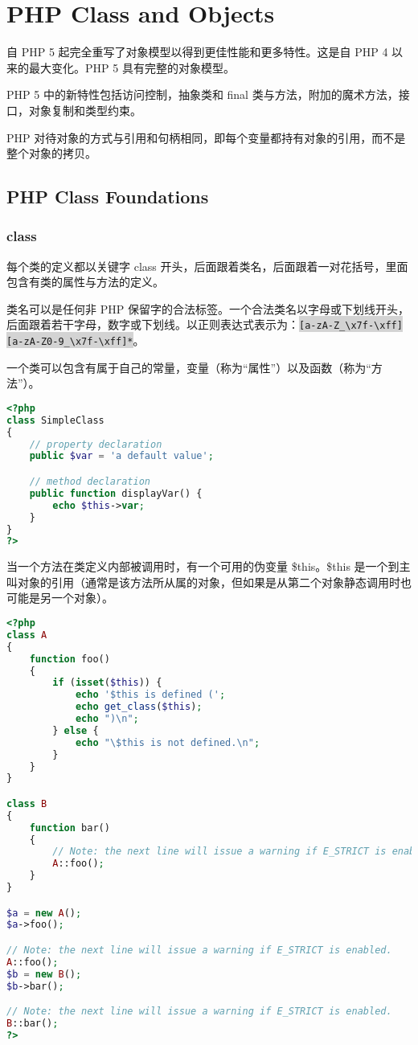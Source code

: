 \part{PHP Class and Objects}


自 PHP 5 起完全重写了对象模型以得到更佳性能和更多特性。这是自 PHP 4 以来的最大变化。PHP 5 具有完整的对象模型。

PHP 5 中的新特性包括访问控制，抽象类和 final 类与方法，附加的魔术方法，接口，对象复制和类型约束。

PHP 对待对象的方式与引用和句柄相同，即每个变量都持有对象的引用，而不是整个对象的拷贝。


\chapter{PHP Class Foundations}

\section{class}


每个类的定义都以关键字 class 开头，后面跟着类名，后面跟着一对花括号，里面包含有类的属性与方法的定义。

类名可以是任何非 PHP 保留字的合法标签。一个合法类名以字母或下划线开头，后面跟着若干字母，数字或下划线。以正则表达式表示为：\colorbox{lightgray}{\texttt{[a-zA-Z\_\textbackslash x7f-\textbackslash xff][a-zA-Z0-9\_\textbackslash x7f-\textbackslash xff]*}}。

一个类可以包含有属于自己的常量，变量（称为“属性”）以及函数（称为“方法”）。

\begin{lstlisting}[language=PHP]
<?php
class SimpleClass
{
    // property declaration
    public $var = 'a default value';

    // method declaration
    public function displayVar() {
        echo $this->var;
    }
}
?>
\end{lstlisting}

当一个方法在类定义内部被调用时，有一个可用的伪变量 \$this。\$this 是一个到主叫对象的引用（通常是该方法所从属的对象，但如果是从第二个对象静态调用时也可能是另一个对象）。




\begin{lstlisting}[language=PHP]
<?php
class A
{
    function foo()
    {
        if (isset($this)) {
            echo '$this is defined (';
            echo get_class($this);
            echo ")\n";
        } else {
            echo "\$this is not defined.\n";
        }
    }
}

class B
{
    function bar()
    {
        // Note: the next line will issue a warning if E_STRICT is enabled.
        A::foo();
    }
}

$a = new A();
$a->foo();

// Note: the next line will issue a warning if E_STRICT is enabled.
A::foo();
$b = new B();
$b->bar();

// Note: the next line will issue a warning if E_STRICT is enabled.
B::bar();
?>
\end{lstlisting}

